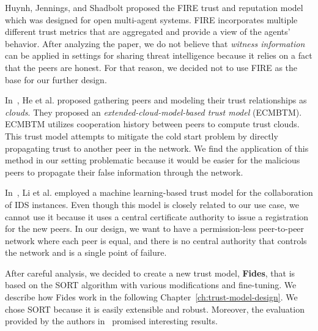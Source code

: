 Huynh, Jennings, and Shadbolt proposed the FIRE trust and reputation model~\cite{huynh2006integrated} which was designed for open multi-agent systems.
FIRE incorporates multiple different trust metrics that are aggregated and provide a view of the agents' behavior.
After analyzing the paper, we do not believe that \textit{witness information}~\cite{huynh2006integrated} can be applied in settings for sharing threat intelligence because it relies on a fact that the peers are honest.
For that reason, we decided not to use FIRE as the base for our further design.

In~\cite{1562680}, He et al. proposed gathering peers and modeling their trust relationships as \textit{clouds}. They proposed an \textit{extended-cloud-model-based trust model} (ECMBTM).
ECMBTM utilizes cooperation history between peers to compute trust clouds. 
This trust model attempts to mitigate the cold start problem by directly propagating trust to another peer in the network.
We find the application of this method in our setting problematic because it would be easier for the malicious peers to propagate their false information through the network.

In~\cite{li2014design}, Li et al. employed a machine learning-based trust model for the collaboration of IDS instances.
Even though this model is closely related to our use case, we cannot use it because it uses a central certificate authority to issue a registration for the new peers. 
In our design, we want to have a permission-less peer-to-peer network where each peer is equal, and there is no central authority that controls the network and is a single point of failure.

\vspace{1cm}

\noindent
After careful analysis, we decided to create a new trust model, \textbf{Fides}, that is based on the SORT algorithm with various modifications and fine-tuning.
We describe how Fides work in the following Chapter~\ref{ch:trust-model-design}.
We chose SORT because it is easily extensible and robust. 
Moreover, the evaluation provided by the authors in~\cite{sort} promised interesting results.